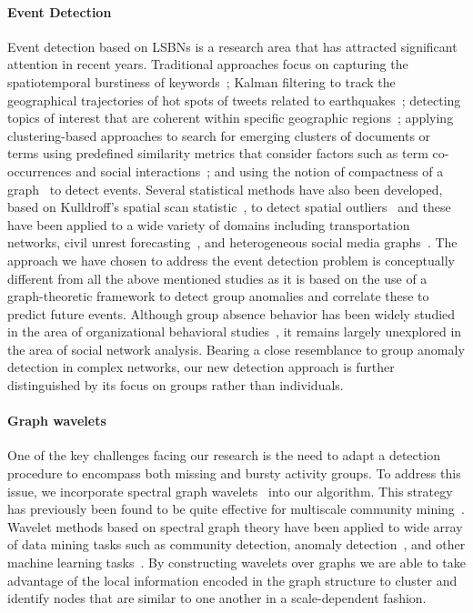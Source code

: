\paragraph{Event Detection}
Event detection based on LSBNs is a research area that has attracted significant attention in recent years. Traditional approaches focus on capturing the spatiotemporal burstiness of keywords~\cite{lappas2009burstiness,lappas2012spatiotemporal}; Kalman filtering to track the geographical trajectories of hot spots of tweets related to earthquakes~\cite{sakaki2010earthquake}; detecting topics of interest that are coherent within specific geographic regions~\cite{eisenstein2010latent,hong2012discovering,yin2011geographical}; applying clustering-based approaches to search for emerging clusters of documents or terms using predefined similarity metrics that consider factors such as term co-occurrences and social interactions~\cite{aggarwal2012event,sayyadi2009event,watanabe2011jasmine,weng2011event}; and using the notion of compactness of a graph~\cite{rozenshtein2014event} to detect events. Several statistical methods have also been developed, based on Kulldroff's spatial scan statistic~\cite{kulldorff1997spatial}, to detect spatial outliers~\cite{chen2008detecting} and these have been applied to a wide variety of domains including transportation networks, civil unrest forecasting~\cite{zhao2014unsupervised}, and heterogeneous social media graphs~\cite{chen2014non}. The approach we have chosen to address the event detection problem is conceptually different from all the above mentioned studies as it is based on the use of a graph-theoretic framework to detect group anomalies and correlate these to predict future events. Although group absence behavior has been widely studied in the area of organizational behavioral studies~\cite{gaudine2001effects,seamonds1982stress}, it remains largely unexplored in the area of social network analysis.
Bearing a close resemblance to group anomaly detection in complex networks, our new detection approach is further distinguished by its focus on groups rather than individuals.


\paragraph{Graph wavelets}
One of the key challenges facing our research is the need to adapt a detection procedure to encompass both missing and bursty activity groups. To address this issue, we incorporate spectral graph wavelets~\cite{hammond2011wavelets} into our algorithm. This strategy has previously been found to be quite effective for multiscale community mining~\cite{tremblay2014graph}.
Wavelet methods based on spectral graph theory have been applied to wide array of data mining tasks such as community detection, anomaly detection~\cite{calderara2011detecting}, and other machine learning tasks~\cite{shuman_ACHA_2013,ghosh2003wavelet,rustamov2013wavelets,2000wavecluster}. By constructing wavelets over graphs we are able to take advantage of the local information encoded in the graph structure to cluster and identify nodes that are similar to one another in a scale-dependent fashion.

